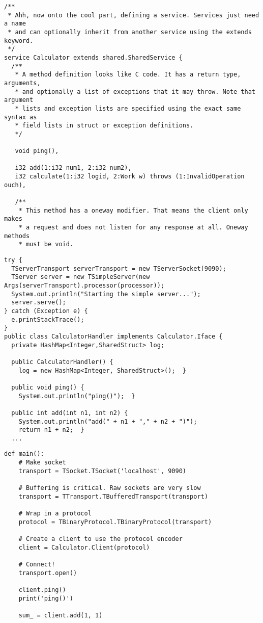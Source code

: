 \documentclass[Screen16to9,17pt]{foils}
\begin{document}

\begin{verbatim}
/**
 * Ahh, now onto the cool part, defining a service. Services just need a name
 * and can optionally inherit from another service using the extends keyword.
 */
service Calculator extends shared.SharedService {
  /**
   * A method definition looks like C code. It has a return type, arguments,
   * and optionally a list of exceptions that it may throw. Note that argument
   * lists and exception lists are specified using the exact same syntax as
   * field lists in struct or exception definitions.
   */

   void ping(),

   i32 add(1:i32 num1, 2:i32 num2),
   i32 calculate(1:i32 logid, 2:Work w) throws (1:InvalidOperation ouch),

   /**
    * This method has a oneway modifier. That means the client only makes
    * a request and does not listen for any response at all. Oneway methods
    * must be void.
\end{verbatim}


\begin{verbatim}
try {
  TServerTransport serverTransport = new TServerSocket(9090);
  TServer server = new TSimpleServer(new Args(serverTransport).processor(processor));
  System.out.println("Starting the simple server...");
  server.serve();
} catch (Exception e) {
  e.printStackTrace();
}
public class CalculatorHandler implements Calculator.Iface {
  private HashMap<Integer,SharedStruct> log;

  public CalculatorHandler() {
    log = new HashMap<Integer, SharedStruct>();  }

  public void ping() {
    System.out.println("ping()");  }

  public int add(int n1, int n2) {
    System.out.println("add(" + n1 + "," + n2 + ")");
    return n1 + n2;  }
  ...
\end{verbatim}



\begin{verbatim}
def main():
    # Make socket
    transport = TSocket.TSocket('localhost', 9090)

    # Buffering is critical. Raw sockets are very slow
    transport = TTransport.TBufferedTransport(transport)

    # Wrap in a protocol
    protocol = TBinaryProtocol.TBinaryProtocol(transport)

    # Create a client to use the protocol encoder
    client = Calculator.Client(protocol)

    # Connect!
    transport.open()

    client.ping()
    print('ping()')

    sum_ = client.add(1, 1)
\end{verbatim}
\end{document}
